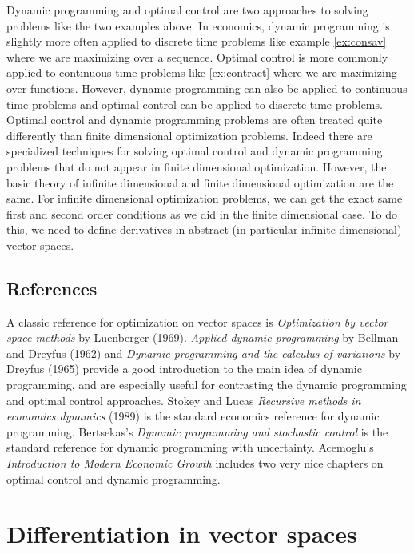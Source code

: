 \documentclass[12pt,reqno]{amsart}
\theoremstyle{definition}
\begin{document}
Dynamic programming and optimal control are two approaches to solving
problems like the two examples above. In economics, dynamic
programming is slightly more often applied to discrete time problems
like example \ref{ex:consav} where we are maximizing over a sequence. Optimal
control is more commonly applied to continuous time problems like
\ref{ex:contract} where we are maximizing over functions. However,
dynamic programming can also be applied to continuous time problems
and optimal control can be applied to discrete time problems. 
Optimal control and dynamic programming 
problems are often treated quite differently than finite dimensional
optimization problems. Indeed there are specialized techniques for
solving optimal control and dynamic programming problems that do not
appear in finite dimensional optimization. However, the basic theory
of infinite dimensional and finite dimensional optimization are the
same. 
For infinite dimensional optimization problems, we can get the exact
same first and second order conditions as we did in the finite
dimensional case. To do this, we need to define derivatives in
abstract (in particular infinite dimensional) vector spaces. 

\subsection{References}
A classic reference for optimization on vector spaces is
\textit{Optimization by vector space methods} by Luenberger
(1969). \textit{Applied dynamic programming} by Bellman and Dreyfus
(1962) and \textit{Dynamic programming and the calculus of variations}
by Dreyfus (1965) provide a good introduction to the main idea of
dynamic programming, and are especially useful for contrasting the
dynamic programming and optimal control approaches. Stokey and Lucas
\textit{Recursive methods in economics dynamics} (1989) is the
standard economics reference for dynamic programming. Bertsekas's
\textit{Dynamic programming and stochastic control} is the standard
reference for dynamic programming with uncertainty. Acemoglu's
\textit{Introduction to Modern Economic Growth} includes two very nice
chapters on optimal control and dynamic programming.


\section{Differentiation in vector spaces}
\end{document}
